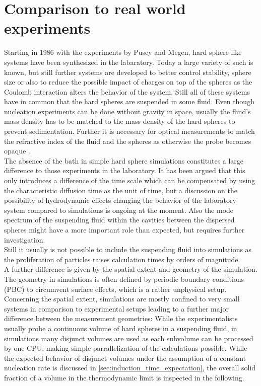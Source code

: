\section{Comparison to real world experiments} 
\label{sec:comparison}

Starting in 1986 with the experiments by Pusey and Megen\cite{Pusey1986}, hard sphere like systems have been synthesized in the labaratory. Today a large variety of such is known, but still further systems are developed to better control stability, sphere size or also to reduce the possible impact of charges on top of the spheres as the Coulomb interaction alters the behavior of the system. Still all of these systems have in common that the hard spheres are suspended in some fluid. Even though nucleation experiments can be done without gravity in space\cite{Doherty1998}, usually the fluid's mass density has to be matched to the mass density of the hard spheres to prevent sedimentation. Further it is necessary for optical measurements to match the refractive index of the fluid and the spheres as otherwise the probe becomes opaque .\\

The absence of the bath in simple hard sphere simulations constitutes a large difference to those experiments in the laboratory. It has been argued that this only introduces a difference of the time scale which can be compensated by using the characteristic diffusion time as the unit of time, but a discussion on the possibility of hydrodynamic effects changing the behavior of the laboratory system compared to simulations is ongoing at the moment.
Also the mode spectrum of the suspending fluid within the cavities between the dispersed spheres might have a more important role 
than expected, but requires further investigation.\\ 
Still it usually is not possible to include the suspending fluid into simulations as the proliferation of particles raises calculation times by orders of magnitude.\\

A further difference is given by the spatial extent and geometry of the simulation. The geometry in simulations is often defined by periodic boundary conditions (PBC) to circumvent surface effects, which is a rather unphysical setup.\\ 
Concerning the spatial extent, simulations are mostly confined to very small systems in comparison to experimental setups leading to a further major difference between the measurement geometries: While the experimentalists usually probe a continuous volume of hard spheres in a suspending fluid, in simulations many disjunct volumes are used as each subvolume can be processed by one CPU, making simple parrallelization of the calculations possible. While the expected behavior of disjunct volumes under the assumption of a constant nucleation rate is discussed in \autoref{sec:induction_time_expectation}, the overall solid fraction of a volume in the thermodynamic limit is inspected in the following.\\


